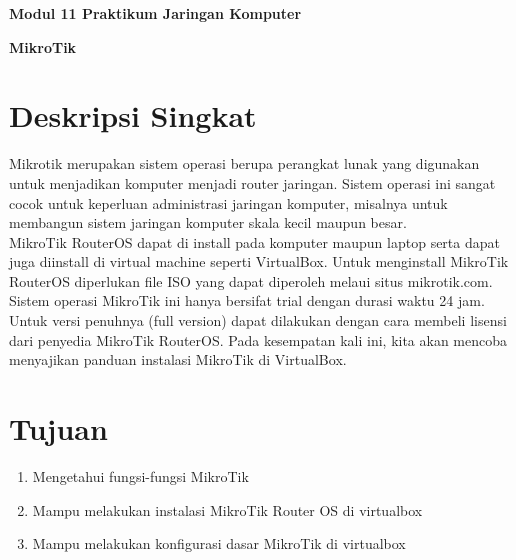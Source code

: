 \documentclass{article}
\begin{document}
    \begin{center}
        \textbf{Modul 11 Praktikum Jaringan Komputer}

        \textbf{MikroTik}
    \end{center}

    \section*{Deskripsi Singkat}
    \hspace{\parindent} Mikrotik merupakan sistem operasi berupa perangkat lunak yang 
    digunakan untuk menjadikan komputer menjadi router jaringan. 
    Sistem operasi ini sangat cocok untuk keperluan administrasi 
    jaringan komputer, misalnya untuk membangun sistem jaringan komputer 
    skala kecil maupun besar.\\

    MikroTik RouterOS dapat di install pada komputer maupun laptop serta 
    dapat juga diinstall di virtual machine seperti VirtualBox. 
    Untuk menginstall MikroTik RouterOS diperlukan file ISO yang dapat diperoleh 
    melaui situs mikrotik.com. Sistem operasi MikroTik ini hanya bersifat 
    trial dengan durasi waktu 24 jam. Untuk versi penuhnya (full version) 
    dapat dilakukan dengan cara membeli lisensi dari penyedia MikroTik RouterOS. 
    Pada kesempatan kali ini, kita akan mencoba menyajikan panduan instalasi 
    MikroTik di VirtualBox.


    \section*{Tujuan}
    \begin{enumerate}
        \item Mengetahui fungsi-fungsi MikroTik 
        \item Mampu melakukan instalasi MikroTik Router OS di virtualbox 
        \item Mampu melakukan konfigurasi dasar MikroTik di virtualbox
        \newline 
    \end{enumerate}


\end{document}
